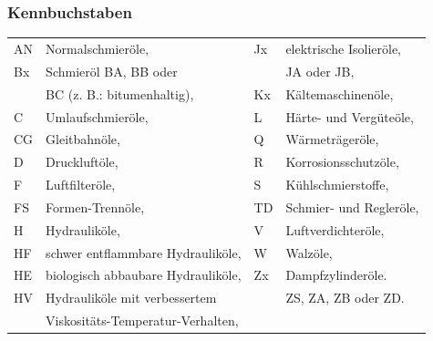\begin{frame}
  \frametitle{Kennbuchstaben }
  \begin{tabular}[t]{@{}ll@{\quad}ll@{}}
    \toprule
    AN  & Normalschmieröle,                    & Jx  & elektrische Isolieröle,             \\
    Bx  & Schmieröl BA, BB oder                &     & JA oder JB,                         \\
        & BC (z. B.: bitumenhaltig),           & Kx  & Kältemaschinenöle,                  \\
    C   & Umlaufschmieröle,                    & L   & Härte- und Vergüteöle,              \\
    CG  & Gleitbahnöle,                        & Q   & Wärmeträgeröle,                     \\
    D   & Druckluftöle,                        & R   & Korrosionsschutzöle,                \\
    F   & Luftfilteröle,                       & S   & Kühlschmierstoffe,                  \\
    FS  & Formen-Trennöle,                     & TD  & Schmier- und Regleröle,             \\
    H   & Hydrauliköle,                        & V   & Luftverdichteröle,                  \\
    HF  & schwer entflammbare Hydraulik\"ole,  & W   & Walzöle,                            \\
    HE  & biologisch abbaubare Hydraulik\"ole, & Zx  & Dampfzylinderöle.                   \\ 
    HV  & Hydrauliköle mit verbessertem        &     & ZS, ZA, ZB oder ZD.\\
        & Viskositäts-Temperatur-Verhalten, \\
    \bottomrule
  \end{tabular}


\end{frame}
